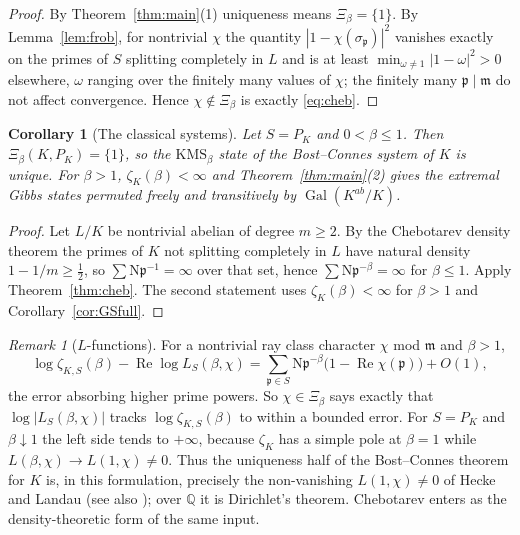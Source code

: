 \documentclass[11pt]{amsart}
\numberwithin{equation}{section}
\newtheorem{corollary}[theorem]{Corollary}
\theoremstyle{definition}
\theoremstyle{remark}
\newtheorem{remark}[theorem]{Remark}
\newcommand{\Q}{\mathbb{Q}}
\newcommand{\Gal}{\operatorname{Gal}}
\newcommand{\Ns}{\mathrm{N}}
\newcommand{\pp}{\mathfrak{p}}
\newcommand{\mm}{\mathfrak{m}}
\begin{document}
\begin{proof}
By Theorem~\ref{thm:main}(1) uniqueness means $\Xi_\beta=\{1\}$. By
Lemma~\ref{lem:frob}, for nontrivial $\chi$ the quantity
$|1-\chi(\sigma_\pp)|^2$ vanishes exactly on the primes of $S$ splitting
completely in $L$ and is at least $\min_{\omega\neq1}|1-\omega|^2>0$ elsewhere,
$\omega$ ranging over the finitely many values of $\chi$; the finitely many
$\pp\mid\mm$ do not affect convergence. Hence $\chi\notin\Xi_\beta$ is exactly
\eqref{eq:cheb}.
\end{proof}

\begin{corollary}[The classical systems]\label{cor:full}
Let $S=P_K$ and $0<\beta\le1$. Then $\Xi_\beta(K,P_K)=\{1\}$, so the
$\mathrm{KMS}_\beta$ state of the Bost--Connes system of $K$ is unique. For
$\beta>1$, $\zeta_K(\beta)<\infty$ and Theorem~\ref{thm:main}(2) gives the
extremal Gibbs states permuted freely and transitively by $\Gal(K^{ab}/K)$.
\end{corollary}

\begin{proof}
Let $L/K$ be nontrivial abelian of degree $m\ge2$. By the Chebotarev density
theorem the primes of $K$ not splitting completely in $L$ have natural density
$1-1/m\ge\tfrac12$, so $\sum\Ns\pp^{-1}=\infty$ over that set, hence
$\sum\Ns\pp^{-\beta}=\infty$ for $\beta\le1$. Apply Theorem~\ref{thm:cheb}. The
second statement uses $\zeta_K(\beta)<\infty$ for $\beta>1$ and
Corollary~\ref{cor:GSfull}.
\end{proof}

\begin{remark}[$L$-functions]\label{rem:Lfunction}
For a nontrivial ray class character $\chi$ mod $\mm$ and $\beta>1$,
\[
\log\zeta_{K,S}(\beta)-\operatorname{Re}\log L_S(\beta,\chi)
=\sum_{\pp\in S}\Ns\pp^{-\beta}\bigl(1-\operatorname{Re}\chi(\pp)\bigr)+O(1),
\]
the error absorbing higher prime powers. So $\chi\in\Xi_\beta$ says exactly that
$\log|L_S(\beta,\chi)|$ tracks $\log\zeta_{K,S}(\beta)$ to within a bounded
error. For $S=P_K$ and $\beta\downarrow1$ the left side tends to $+\infty$,
because $\zeta_K$ has a simple pole at $\beta=1$ while $L(\beta,\chi)\to L(1,\chi)\neq0$.
Thus the uniqueness half of the Bost--Connes theorem for $K$ is, in this
formulation, precisely the non-vanishing $L(1,\chi)\neq0$ of Hecke \cite{Hecke} and Landau \cite{Landau}
(see also \cite[Ch.~VII]{Neu});
over $\Q$ it is Dirichlet's theorem. Chebotarev enters as the density-theoretic
form of the same input.
\end{remark}
\end{document}
